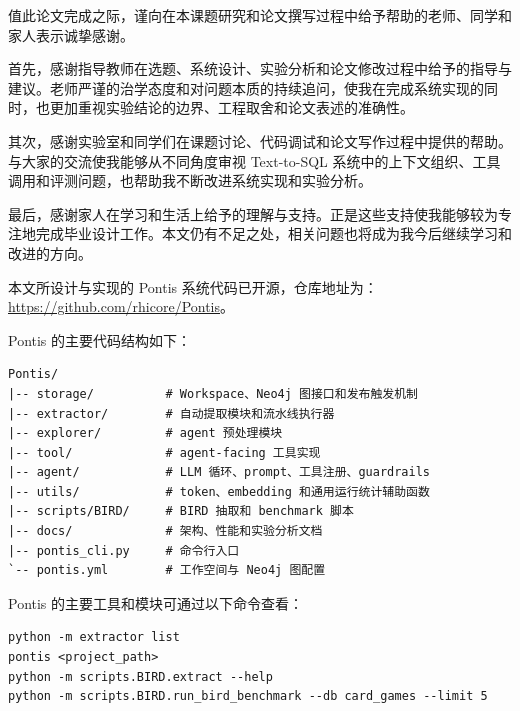 \documentclass[
    bachelor,
    pdflinks,
]{xjtuthesis}
\begin{document}
\xjtuendcontent


值此论文完成之际，谨向在本课题研究和论文撰写过程中给予帮助的老师、同学和家人表示诚挚感谢。

首先，感谢指导教师在选题、系统设计、实验分析和论文修改过程中给予的指导与建议。老师严谨的治学态度和对问题本质的持续追问，使我在完成系统实现的同时，也更加重视实验结论的边界、工程取舍和论文表述的准确性。

其次，感谢实验室和同学们在课题讨论、代码调试和论文写作过程中提供的帮助。与大家的交流使我能够从不同角度审视 Text-to-SQL 系统中的上下文组织、工具调用和评测问题，也帮助我不断改进系统实现和实验分析。

最后，感谢家人在学习和生活上给予的理解与支持。正是这些支持使我能够较为专注地完成毕业设计工作。本文仍有不足之处，相关问题也将成为我今后继续学习和改进的方向。


\xjtuappendix


本文所设计与实现的 Pontis 系统代码已开源，仓库地址为：\url{https://github.com/rhicore/Pontis}。

Pontis 的主要代码结构如下：

\begin{verbatim}
Pontis/
|-- storage/          # Workspace、Neo4j 图接口和发布触发机制
|-- extractor/        # 自动提取模块和流水线执行器
|-- explorer/         # agent 预处理模块
|-- tool/             # agent-facing 工具实现
|-- agent/            # LLM 循环、prompt、工具注册、guardrails
|-- utils/            # token、embedding 和通用运行统计辅助函数
|-- scripts/BIRD/     # BIRD 抽取和 benchmark 脚本
|-- docs/             # 架构、性能和实验分析文档
|-- pontis_cli.py     # 命令行入口
`-- pontis.yml        # 工作空间与 Neo4j 图配置
\end{verbatim}

Pontis 的主要工具和模块可通过以下命令查看：

\begin{verbatim}
python -m extractor list
pontis <project_path>
python -m scripts.BIRD.extract --help
python -m scripts.BIRD.run_bird_benchmark --db card_games --limit 5
\end{verbatim}

\xjtuendappendix
\end{document}
